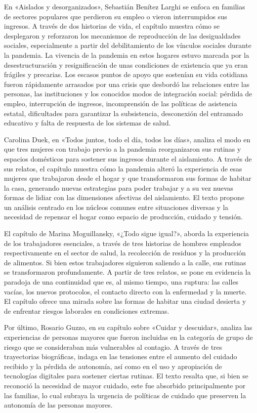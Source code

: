 \begin{refsection}
En «Aislados y desorganizados», Sebastián Benítez Larghi se enfoca en familias de sectores populares que perdieron su empleo o vieron interrumpidos sus ingresos. A través de dos historias de vida, el capítulo muestra cómo se desplegaron y reforzaron los mecanismos de reproducción de las desigualdades sociales, especialmente a partir del debilitamiento de los vínculos sociales durante la pandemia. La vivencia de la pandemia en estos hogares estuvo marcada por la desestructuración y resignificación de unas condiciones de existencia que ya eran frágiles y precarias. Los escasos puntos de apoyo que sostenían su vida cotidiana fueron rápidamente arrasados por una crisis que desbordó las relaciones entre las personas, las instituciones y los conocidos modos de integración social: pérdida de empleo, interrupción de ingresos, incomprensión de las políticas de asistencia estatal, dificultades para garantizar la subsistencia, desconexión del entramado educativo y falta de respuesta de los sistemas de salud.

Carolina Duek, en «Todos juntos, todo el día, todos los días», analiza el modo en que tres mujeres con trabajo previo a la pandemia reorganizaron sus rutinas y espacios domésticos para sostener sus ingresos durante el aislamiento. A través de sus relatos, el capítulo muestra cómo la pandemia alteró la experiencia de esas mujeres que trabajaron desde el hogar y que transformaron sus formas de habitar la casa, generando nuevas estrategias para poder trabajar y a su vez nuevas formas de lidiar con las dimensiones afectivas del aislamiento. El texto propone un análisis centrado en los núcleos comunes entre situaciones diversas y la necesidad de repensar el hogar como espacio de producción, cuidado y tensión.

El capítulo de Marina Moguillansky, «¿Todo sigue igual?», aborda la experiencia de los trabajadores esenciales, a través de tres historias de hombres empleados respectivamente en el sector de salud, la recolección de residuos y la producción de alimentos. Si bien estos trabajadores siguieron saliendo a la calle, sus rutinas se transformaron profundamente. A partir de tres relatos, se pone en evidencia la paradoja de una continuidad que es, al mismo tiempo, una ruptura: las calles vacías, los nuevos protocolos, el contacto directo con la enfermedad y la muerte. El capítulo ofrece una mirada sobre las formas de habitar una ciudad desierta y de enfrentar riesgos laborales en condiciones extremas.

Por último, Rosario Guzzo, en su capítulo sobre «Cuidar y descuidar», analiza las experiencias de personas mayores que fueron incluidas en la categoría de grupo de riesgo que se consideraban más vulnerables al contagio. A través de tres trayectorias biográficas, indaga en las tensiones entre el aumento del cuidado recibido y la pérdida de autonomía, así como en el uso y apropiación de tecnologías digitales para sostener ciertas rutinas. El texto resalta que, si bien se reconoció la necesidad de mayor cuidado, este fue absorbido principalmente por las familias, lo cual subraya la urgencia de políticas de cuidado que preserven la autonomía de las personas mayores.


\end{refsection}
